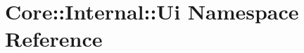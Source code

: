 \hypertarget{namespace_core_1_1_internal_1_1_ui}{\section{Core\-:\-:Internal\-:\-:Ui Namespace Reference}
\label{namespace_core_1_1_internal_1_1_ui}
}
